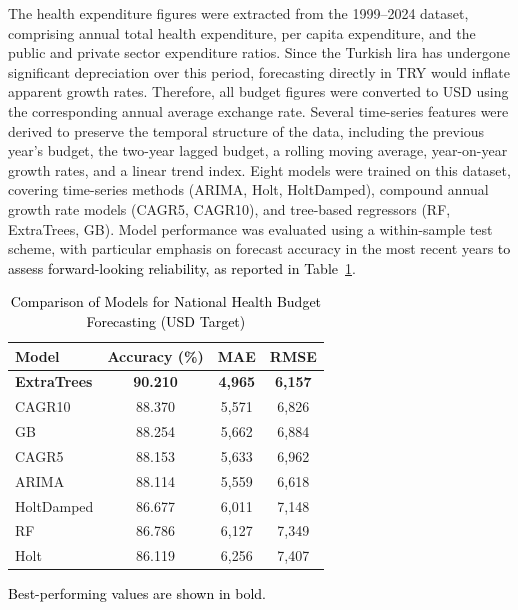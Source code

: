 \documentclass[final, 9pt, twocolumn]{saucis}
\newcommand{\rev}[1]{\textcolor{black}{#1}}
\begin{document}
The health expenditure figures were extracted from the 1999--2024 dataset, comprising annual total health expenditure, per capita expenditure, and the public and private sector expenditure ratios. Since the Turkish lira has undergone significant depreciation over this period, forecasting directly in TRY would inflate apparent growth rates. Therefore, all budget figures were converted to USD using the corresponding annual average exchange rate. Several time-series features were derived to preserve the temporal structure of the data, including the previous year's budget, the two-year lagged budget, a rolling moving average, year-on-year growth rates, and a linear trend index. Eight models were trained on this dataset, covering time-series methods (ARIMA, Holt, HoltDamped), compound annual growth rate models (CAGR5, CAGR10), and tree-based regressors (RF, ExtraTrees, GB). Model performance was evaluated using a within-sample test scheme, with particular emphasis on forecast accuracy in the most recent years \rev{to assess forward-looking reliability, as reported in Table~\ref{tab:budget_model_general}}.

\begin{table}[h]
\begin{threeparttable}
\centering
\caption{\rev{Comparison of Models for National Health Budget Forecasting (USD Target)}}
\label{tab:budget_model_general}
\begin{tabular}{lccc}
\hline
\textbf{Model} & \textbf{Accuracy (\%)} & \textbf{MAE} & \textbf{RMSE} \\
\hline
\textbf{ExtraTrees}       & \textbf{90.210} & \textbf{4{,}965}  & \textbf{6{,}157}  \\
CAGR10           & 88.370 & 5{,}571  & 6{,}826  \\
GB & 88.254 & 5{,}662  & 6{,}884  \\
CAGR5            & 88.153 & 5{,}633  & 6{,}962  \\
ARIMA            & 88.114 & 5{,}559  & 6{,}618  \\
HoltDamped          & 86.677 & 6{,}011  & 7{,}148  \\
RF     & 86.786 & 6{,}127  & 7{,}349  \\
Holt    & 86.119 & 6{,}256  & 7{,}407  \\
\hline
\end{tabular}
\begin{tablenotes}
\footnotesize
\item \rev{Best-performing values are shown in bold.}
\end{tablenotes}
\end{threeparttable}
\end{table}
\end{document}
